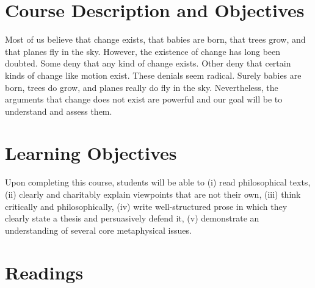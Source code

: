 \documentclass[article,oneside]{memoir}
\begin{document}
\section{Course Description and Objectives}

Most of us believe that change exists, that babies are born, that trees grow, and that planes fly in the sky. However, the existence of change has long been doubted. Some deny that any kind of change exists. Other deny that certain kinds of change like motion exist. These denials seem radical. Surely babies are born, trees do grow, and planes really do fly in the sky. Nevertheless, the arguments that change does not exist are powerful and our goal will be to understand and assess them. 


\section{Learning Objectives}

Upon completing this course, students will be able to (i) read
philosophical texts, (ii) clearly and charitably explain viewpoints that
are not their own, (iii) think critically and philosophically, (iv)
write well-structured prose in which they clearly state a thesis and
persuasively defend it, (v) demonstrate an understanding of several core
metaphysical issues.

\section{Readings}
\end{document}
